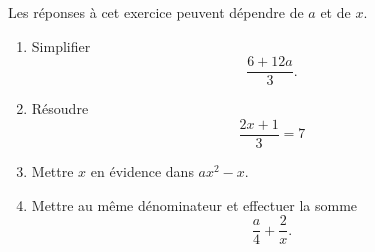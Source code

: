 
\begin{exercice}\label{exosmath-0014}

    Les réponses à cet exercice peuvent dépendre de \( a\) et de \( x\).
    \begin{multicols}{2}
        \begin{enumerate}
            \item
                Simplifier
                \begin{equation*}
                    \frac{ 6+12a }{ 3 }.
                \end{equation*}
            \item
                Résoudre
                \begin{equation*}
                    \frac{ 2x+1 }{ 3 }=7
                \end{equation*}

            \item
                Mettre \( x\) en évidence dans \( ax^2-x\).
            \item
                Mettre au même dénominateur et effectuer la somme
                \begin{equation*}
                    \frac{ a }{ 4 }+\frac{ 2 }{ x }.
                \end{equation*}
        \end{enumerate}
    \end{multicols}

\end{exercice}
